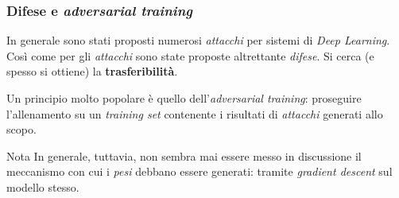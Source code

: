 \documentclass{beamer}
\begin{document}
{%

\begin{frame}
	\frametitle{Difese e \textit{adversarial training}}
	In generale sono stati proposti numerosi \textit{attacchi} per sistemi di \textit{Deep Learning}. Così come per gli \textit{attacchi} sono state proposte altrettante \textit{difese}. Si cerca (e spesso si ottiene) la \textbf{trasferibilità}.

	\hfill\break
	Un principio molto popolare è quello dell'\textit{adversarial training}: proseguire l'allenamento su un \textit{training set} contenente i risultati di \textit{attacchi} generati allo scopo.

	\hfill\break
	\begin{alertblock}{Nota}
		In generale, tuttavia, non sembra mai essere messo in discussione il meccanismo con cui i \textit{pesi} debbano essere generati: tramite \textit{gradient descent} \alert{sul modello stesso}.
	\end{alertblock}
\end{frame}

}



\end{document}
